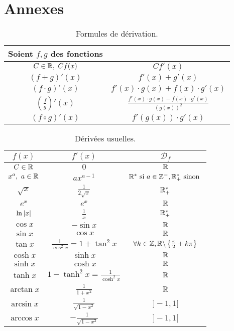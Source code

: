 \part{Annexes}
\def\arraystretch{1.5}
\begin{table}[!ht]
    \centering
    \begin{tabular}{cc}
        \toprule
        Soient $f, g$ des fonctions \\
        \midrule
        $C \in \mathbb{R},\ C f(x)$ & $C f'(x)$  \\
        $(f + g)'(x)$ & $f'(x) + g'(x)$ \\
        $(f \cdot g)'(x)$ & $f'(x) \cdot g(x) + f(x) \cdot g'(x)$ \\
        $\left( \frac{f}{g} \right)'(x)$ & $\frac{f'(x) \cdot g(x) - f(x) \cdot g'(x)}{(g(x))^2}$ \\
        $(f \circ g)'(x)$ & $f'(g(x)) \cdot g'(x) $ \\
        \bottomrule
    \end{tabular}
    \caption{Formules de dérivation.}
    \label{tab:formules_derivation}
\end{table}

\begin{table}[!ht]
    \centering
    \begin{tabular}{ccc}
        \toprule
        $f(x)$ & $f'(x)$ & $\mathcal{D}_f$ \\ 
        \midrule
        $C \in \mathbb{R}$ & $0$ & $\mathbb{R}$ \\
        $x^a,\ a \in \mathbb{R}$ & $a x^{a - 1}$ & $\mathbb{R}^* \text{ si } a \in \mathbb{Z}^-, \mathbb{R}_+^* \text{ sinon }$ \\
        $\sqrt{x}$ & $\frac{1}{2\sqrt{x}}$ & $\mathbb{R}_+^*$ \\
        $e^x$ & $e^x$ & $\mathbb{R}$ \\
        $\ln{\abs{x}}$ & $\frac{1}{x}$ & $\mathbb{R}_+^*$ \\
        $\cos{x}$ & $-\sin{x}$ & $\mathbb{R}$ \\
        $\sin{x}$ & $\cos{x}$ & $\mathbb{R}$ \\
        $\tan{x}$ & $\frac{1}{\cos^2{x}} = 1 + \tan^2{x}$ & $\forall k \in \mathbb{Z}, \mathbb{R} \backslash \left\{ \frac{\pi}{2} + k \pi \right\}$ \\
        $\cosh{x}$ & $\sinh{x}$ & $\mathbb{R}$ \\
        $\sinh{x}$ & $\cosh{x}$ & $\mathbb{R}$ \\
        $\tanh{x}$ & $1 - \tanh^2{x} = \frac{1}{\cosh^2{x}}$ & $\mathbb{R}$ \\
        $\arctan{x}$ & $\frac{1}{1 + x^2}$ & $\mathbb{R}$ \\
        $\arcsin{x}$ & $\frac{1}{\sqrt{1 - x^2}}$ & $]-1, 1[$ \\
        $\arccos{x}$ & $-\frac{1}{\sqrt{1 - x^2}}$ & $]-1, 1[$ \\
        \bottomrule
    \end{tabular}
    \caption{Dérivées usuelles.}
    \label{tab:derivees_usuelles}
\end{table}

